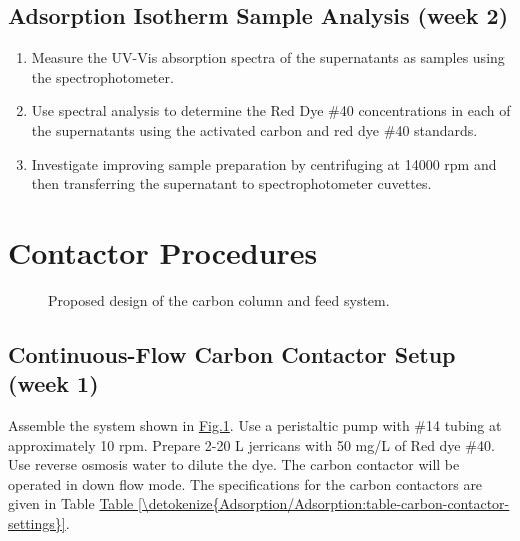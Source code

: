 \documentclass[letterpaper,10pt,english]{sphinxmanual}
\let\sphinxpxdimen\pdfpxdimen\else\newdimen\sphinxpxdimen
\begin{document}
\subsection{Adsorption Isotherm Sample Analysis (week 2)}
\label{\detokenize{Adsorption/Adsorption:adsorption-isotherm-sample-analysis-week-2}}\begin{enumerate}
\item {} 
Measure the UV-Vis absorption spectra of the supernatants as samples using the spectrophotometer.

\item {} 
Use spectral analysis to determine the Red Dye \#40 concentrations in each of the supernatants using the activated carbon and red dye \#40 standards.

\item {} 
Investigate improving sample preparation by centrifuging at 14000 rpm and then transferring the supernatant to spectrophotometer cuvettes.

\end{enumerate}


\section{Contactor Procedures}
\label{\detokenize{Adsorption/Adsorption:contactor-procedures}}\label{\detokenize{Adsorption/Adsorption:heading-adsorption-contactor-procedures}}
\begin{figure}[htbp]
\centering
\capstart

\noindent\sphinxincludegraphics[width=500\sphinxpxdimen]{{Schematic}.png}
\caption{Proposed design of the carbon column and feed system.}\label{\detokenize{Adsorption/Adsorption:id2}}\label{\detokenize{Adsorption/Adsorption:figure-ac-schematic}}\end{figure}


\subsection{Continuous-Flow Carbon Contactor Setup (week 1)}
\label{\detokenize{Adsorption/Adsorption:continuous-flow-carbon-contactor-setup-week-1}}
Assemble the system shown in \hyperref[\detokenize{Adsorption/Adsorption:figure-ac-schematic}]{Fig.\@ \ref{\detokenize{Adsorption/Adsorption:figure-ac-schematic}}}. Use a peristaltic pump with \#14 tubing at approximately 10 rpm. Prepare 2-20 L jerricans with 50 mg/L of Red dye \#40. Use reverse osmosis water to dilute the dye. The carbon contactor will be operated in down flow mode. The specifications for the carbon contactors are given in Table \hyperref[\detokenize{Adsorption/Adsorption:table-carbon-contactor-settings}]{Table \ref{\detokenize{Adsorption/Adsorption:table-carbon-contactor-settings}}}.
\end{document}
